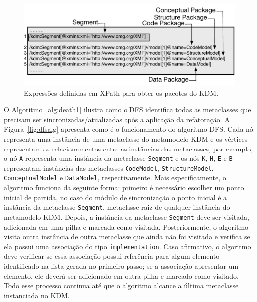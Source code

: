 \begin{figure}[h]
	\centering
	\caption{Expressões definidas em XPath para obter os pacotes do KDM.}
	\label{fig:xpath_queries}
	\includegraphics[scale=0.68]{images/queiresANDATLSBESNew}
	\fautor
\end{figure}

O Algoritmo~\ref{alg:death1} ilustra como o DFS identifica todas as metaclasses que precisam ser sincronizadas/atualizadas após a aplicação da refatoração. A Figura~\ref{fig:dfsalg} apresenta como é o funcionamento do algoritmo DFS. Cada nó representa uma instância de uma metaclasse do metamodelo KDM e os vértices representam os relacionamentos entre as instâncias das metaclasses, por exemplo, o nó \texttt{A} representa uma instância da metaclasse \texttt{Segment} e os nós \texttt{K}, \texttt{H}, \texttt{E} e \texttt{B} representam instâncias das metaclasses \texttt{CodeModel}, \texttt{StructureModel}, \texttt{ConceptualModel} e \texttt{DataModel}, respectivamente. Mais especificamente, o algoritmo funciona da seguinte forma: primeiro é necessário escolher um ponto inicial de partida, no caso do módulo de sincronização o ponto inicial é a instância da metaclasse \texttt{Segment}, metaclasse raiz de qualquer instância do metamodelo KDM. Depois, a instância da metaclasse \texttt{Segment} deve ser visitada, adicionada em uma pilha e marcada como visitada. Posteriormente, o algoritmo visita outra instância de outra metaclasse que ainda não foi visitada e verifica se ela possui uma associação do tipo \texttt{implementation}. Caso afirmativo, o algoritmo deve verificar se essa associação possui referência para algum elemento identificado na lista gerada no primeiro passo; se a associação apresentar um elemento, ele deverá ser adicionado em outra pilha e marcado como visitado. Todo esse processo continua até que o algoritmo alcance a última metaclasse instanciada no KDM. 

